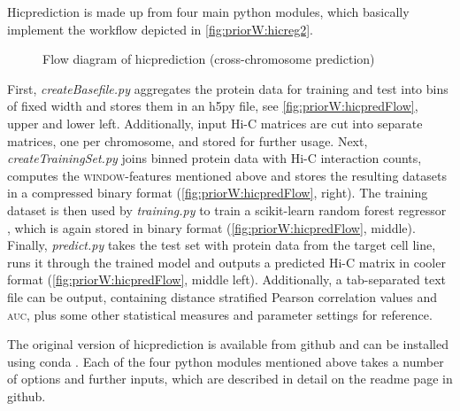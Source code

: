 Hicprediction is made up from four main python modules, which basically implement the workflow depicted in 
\autoref{fig:priorW:hicreg2}. 
\begin{figure}[htb]
 \small
 \centering
 \caption{Flow diagram of hicprediction (cross-chromosome prediction)}
 \label{fig:priorW:hicpredFlow}
\end{figure}
First, \emph{createBasefile.py} aggregates the protein data for training and test into bins of fixed width and stores them in an h5py file, see 
\autoref{fig:priorW:hicpredFlow}, upper and lower left.
Additionally, input Hi-C matrices are cut into separate matrices, one per chromosome, and stored for further usage.
Next, \emph{createTrainingSet.py} joins binned protein data with Hi-C interaction counts, computes the \textsc{window}-features mentioned above and 
stores the resulting datasets in a compressed binary format (\autoref{fig:priorW:hicpredFlow}, right).
The training dataset is then used by \emph{training.py} to train a scikit-learn random forest regressor \cite{Pedregosa2011}, 
which is again stored in binary format (\autoref{fig:priorW:hicpredFlow}, middle).
Finally, \emph{predict.py} takes the test set with protein data from the target cell line, 
runs it through the trained model and outputs a predicted Hi-C matrix in cooler format (\autoref{fig:priorW:hicpredFlow}, middle left).
Additionally, a tab-separated text file can be output, containing distance stratified Pearson correlation values and \textsc{auc},
plus some other statistical measures and parameter settings for reference. 

The original version of hicprediction is available from github \cite{BajoratHicpredWWW2019} and can be 
installed using conda \cite{minicondaWWW2019}.
Each of the four python modules mentioned above takes a number of options and further inputs, 
which are described in detail on the readme page in github.